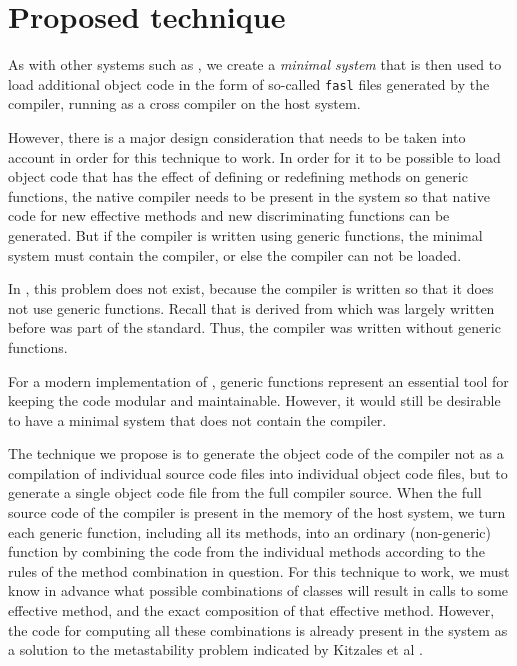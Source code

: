 \section{Proposed technique}
\label{sec-our-technique}

As with other systems such as \sbcl{}, we create a \emph{minimal
  system} that is then used to load additional object code in the form
of so-called \texttt{fasl} files generated by the compiler, running as
a cross compiler on the host system.

However, there is a major design consideration that needs to be taken
into account in order for this technique to work.  In order for it to
be possible to load object code that has the effect of defining or
redefining methods on generic functions, the native compiler needs to
be present in the system so that native code for new effective methods
and new discriminating functions can be generated.  But if the
compiler is written using generic functions, the minimal system must
contain the compiler, or else the compiler can not be loaded.

In \sbcl{}, this problem does not exist, because the compiler is
written so that it does not use generic functions.  Recall that
\sbcl{} is derived from \cmucl{} which was largely written before
\clos{} was part of the \commonlisp{} standard.  Thus, the compiler
was written without generic functions.

For a modern implementation of \commonlisp{}, generic functions
represent an essential tool for keeping the code modular and
maintainable.  However, it would still be desirable to have a minimal
system that does not contain the compiler.

The technique we propose is to generate the object code of the
compiler not as a compilation of individual source code files into
individual object code files, but to generate a single object code
file from the full compiler source.  When the full source code of the
compiler is present in the memory of the host system, we turn each
generic function, including all its methods, into an ordinary
(non-generic) function by combining the code from the individual
methods according to the rules of the method combination in question.
For this technique to work, we must know in advance what possible
combinations of classes will result in calls to some effective method,
and the exact composition of that effective method.  However, the code
for computing all these combinations is already present in the system
as a solution \cite{Strandh:2014:RMI:2635648.2635656} to the
metastability problem indicated by Kitzales et al
\cite{Kiczales:1991:AMP:574212}.

\cite{Strandh:2015:ELS:Environments}
